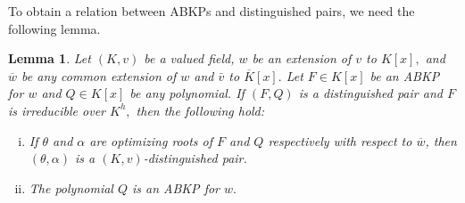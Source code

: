 \documentclass[11pt]{amsart}
\newtheorem{lemma}[theorem]{Lemma}
\theoremstyle{definition}
\theoremstyle{remark}
\numberwithin{equation}{section}
\begin{document}
	To obtain a relation between ABKPs and distinguished pairs, we need the following lemma. 
	\begin{lemma}\label{abl1}
		Let $(K,v)$ be a valued field, $w$ be an extension of $v$ to $K[x],$ and $\overline{w}$ be any common extension of $w$ and $\bar{v}$ to $\overline{K}[x].$ Let $F\in K[x]$ be an ABKP for $w$ and $Q\in K[x]$ be any polynomial. If $(F,Q)$ is a distinguished pair and $F$ is irreducible over $K^h,$ then the following hold:
		\begin{enumerate}[(i)]
			\item If $\theta$ and $\alpha$ are optimizing roots of $F$ and $Q$ respectively with respect to $\overline{w}$, then $(\theta,\alpha)$ is a $(K,v)$-distinguished pair.
			\item The polynomial $Q$ is an ABKP for $w.$
		\end{enumerate}
		\end{lemma}
\end{document}

